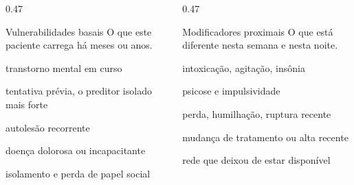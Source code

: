 \begin{frame}{}
\begin{columns}[onlytextwidth, t]
\begin{column}{0.47\textwidth}
\begin{caixanorma}{Vulnerabilidades basais}
O que este paciente carrega h\'a meses ou anos.
\begin{itemc}
\item transtorno mental em curso
\item tentativa pr\'evia, o preditor isolado mais forte
\item autoles\~ao recorrente
\item doen\c{c}a dolorosa ou incapacitante
\item isolamento e perda de papel social
\end{itemc}
\end{caixanorma}
\end{column}
\calha
\begin{column}{0.47\textwidth}
\begin{caixamudanca}{Modificadores proximais}
O que est\'a diferente nesta semana e nesta noite.
\begin{itemc}
\item intoxica\c{c}\~ao, agita\c{c}\~ao, ins\^onia
\item psicose e impulsividade
\item perda, humilha\c{c}\~ao, ruptura recente
\item mudan\c{c}a de tratamento ou alta recente
\item rede que deixou de estar dispon\'ivel
\end{itemc}
\end{caixamudanca}
\end{column}
\end{columns}

\end{frame}

